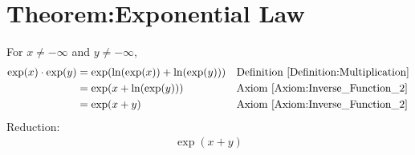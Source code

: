 \documentclass[12pt,a4paper]{report}
\begin{document}
\section{Theorem:Exponential Law}
\label{Theorem:Exponential_Law}
For $x \neq -\infty$ and $y \neq -\infty$,
\begin{align*}
\exp(x) \cdot \exp(y)
&= \exp(\ln(\exp(x)) + \ln(\exp(y)))
&& \text{Definition \ref{Definition:Multiplication}} \\
&= \exp(x + \ln(\exp(y)))
&& \text{Axiom \ref{Axiom:Inverse_Function_2}} \\
&= \exp(x + y)
&& \text{Axiom \ref{Axiom:Inverse_Function_2}} \\
\end{align*}
Reduction:
\begin{align*}
\exp(x + y)
\end{align*}
\end{document}
